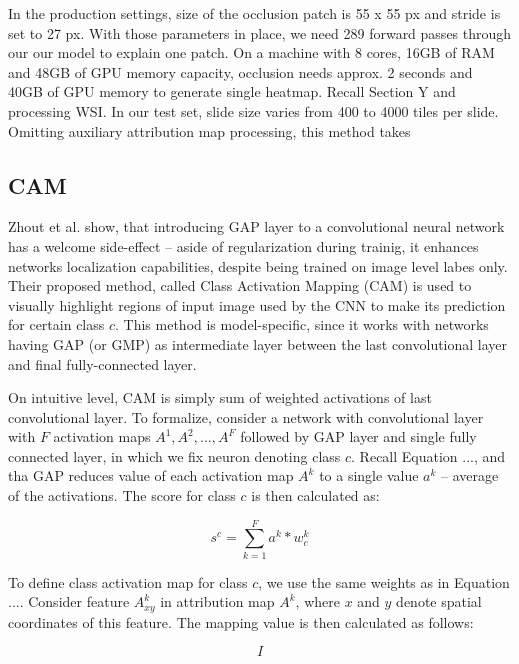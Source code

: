 In the production settings, size of the occlusion patch is 55 x 55 px and stride is set to 27 px. With those parameters in place, we need 289 forward passes through our our model to explain one patch. On a machine with 8 cores, 16GB of RAM and 48GB of GPU memory capacity, occlusion needs approx. 2 seconds and 40GB of GPU memory to generate single heatmap. Recall Section Y and processing WSI. In our test set, slide size varies from 400 to 4000 tiles per slide. Omitting auxiliary attribution map processing, this method takes  


\subsection{CAM}

Zhout et al. show, that introducing GAP layer to a convolutional neural network has a welcome side-effect -- aside of regularization during trainig, it enhances networks localization capabilities, despite being trained on image level labes only. Their proposed method, called Class Activation Mapping (CAM) is used to visually highlight regions of input image used by the CNN to make its prediction for certain class $c$. This method is model-specific, since it works with networks having GAP (or GMP) as intermediate layer between the last convolutional layer and final fully-connected layer. 

On intuitive level, CAM is simply sum of weighted activations of last convolutional layer. To formalize, consider a network with convolutional layer with $F$ activation maps $A^1, A^2, ..., A^F$ followed by GAP layer and single fully connected layer, in which we fix neuron denoting class $c$. Recall Equation ..., and tha GAP reduces value of each activation map $A^k$ to a single value $a^k$ -- average of the activations. The score for class $c$ is then calculated as:

\begin{equation}
    s^c = \sum_{k=1}^F a^k * w^k_c
\end{equation}

To define class activation map for class $c$, we use the same weights as in Equation .... Consider feature $A^k_{xy}$ in attribution map $A^k$, where $x$ and $y$ denote spatial coordinates of this feature. The mapping value is then calculated as follows:

\begin{equation}
    I
\end{equation}


